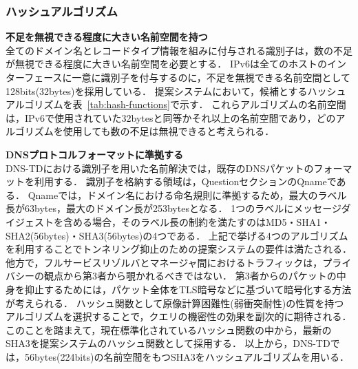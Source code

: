 \subsubsection{ハッシュアルゴリズム}
%
\hspace{-12pt}\textbf{不足を無視できる程度に大きい名前空間を持つ}\\
\hspace{12pt}全てのドメイン名とレコードタイプ情報を組みに付与される識別子は，数の不足が無視できる程度に大きい名前空間を必要とする．
IPv6は全てのホストのインターフェースに一意に識別子を付与するのに，不足を無視できる名前空間として128bits(32bytes)を採用している．
提案システムにおいて，候補とするハッシュアルゴリズムを表~\ref{tab:hash-functions}で示す．
これらアルゴリズムの名前空間は，IPv6で使用されていた32bytesと同等かそれ以上の名前空間であり，どのアルゴリズムを使用しても数の不足は無視できると考えられる．


\hspace{-12pt}\textbf{DNSプロトコルフォーマットに準拠する}\\
\hspace{12pt}DNS-TDにおける識別子を用いた名前解決では，既存のDNSパケットのフォーマットを利用する．
識別子を格納する領域は，QuestionセクションのQnameである．
Qnameでは，ドメイン名における命名規則に準拠するため，最大のラベル長が63bytes，最大のドメイン長が253bytesとなる．
1つのラベルにメッセージダイジェストを含める場合，そのラベル長の制約を満たすのはMD5・SHA1・SHA2(56bytes)・SHA3(56bytes)の4つである．
上記で挙げる4つのアルゴリズムを利用することでトンネリング抑止のための提案システムの要件は満たされる．
他方で，フルサービスリゾルバとマネージャ間におけるトラフィックは，プライバシーの観点から第3者から覗かれるべきではない．
第3者からのパケットの中身を抑止するためには，パケット全体をTLS暗号などに基づいて暗号化する方法が考えられる．
ハッシュ関数として原像計算困難性(弱衝突耐性)の性質を持つアルゴリズムを選択することで，クエリの機密性の効果を副次的に期待される．
このことを踏まえて，現在標準化されているハッシュ関数の中から，最新のSHA3を提案システムのハッシュ関数として採用する．
以上から，DNS-TDでは，56bytes(224bits)の名前空間をもつSHA3をハッシュアルゴリズムを用いる．

